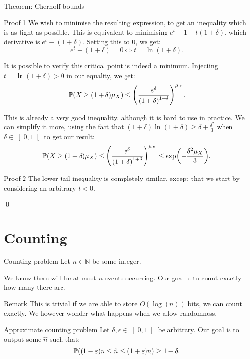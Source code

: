 \documentclass[a4paper]{article}
\begin{document}
\begin{parag}{Theorem: Chernoff bounds}
\begin{subparag}{Proof 1}
        We wish to minimise the resulting expression, to get an inequality which is as tight as possible. This is equivalent to minimising $e^t - 1 - t\left(1 + \delta\right)$, which derivative is $e^t - \left(1 + \delta\right)$. Setting this to $0$, we get: 
        \[e^t - \left(1 + \delta\right) = 0 \iff t = \ln\left(1 + \delta\right).\]

        It is possible to verify this critical point is indeed a minimum. Injecting $t = \ln\left(1 + \delta\right) > 0$ in our equality, we get:
        \[\prob\left(X \geq \left(1 + \delta\right) \mu_X\right) \leq \left(\frac{e^{\delta}}{\left(1+\delta\right)^{1 + \delta}}\right)^{\mu_X}.\]

        This is already a very good inequality, although it is hard to use in practice. We can simplify it more, using the fact that $\left(1 + \delta\right)\ln\left(1 + \delta\right) \geq \delta + \frac{\delta^2}{3}$ when $\delta \in \left]0, 1\right[ $ to get our result:
        \[\prob\left(X \geq \left(1 + \delta\right) \mu_X\right) \leq \left(\frac{e^{\delta}}{\left(1+\delta\right)^{1 + \delta}}\right)^{\mu_X} \leq \exp\left(-\frac{\delta^2 \mu_X}{3}\right).\]
    \end{subparag}

    \begin{subparag}{Proof 2}
        The lower tail inequality is completely similar, except that we start by considering an arbitrary $t < 0$.

        \qed
    \end{subparag}
\end{parag}

\section{Counting}

\begin{parag}{Counting problem}
    Let $n \in \mathbb{N}$ be some integer. 

    We know there will be at most $n$ events occurring. Our goal is to count exactly how many there are.

    \begin{subparag}{Remark}
        This is trivial if we are able to store $O\left(\log\left(n\right)\right)$ bits, we can count exactly. We however wonder what happens when we allow randomness.
    \end{subparag}
\end{parag}

\begin{parag}{Approximate counting problem}
    Let $\delta, \epsilon \in \left]0, 1\right[ $ be arbitrary. Our goal is to output some $\hat{n}$ such that: 
    \[\prob\left(\left(1 - \epsilon\right) n \leq \hat{n} \leq \left(1 + \epsilon\right) n\right) \geq 1 - \delta.\]
\end{parag}
\end{document}
